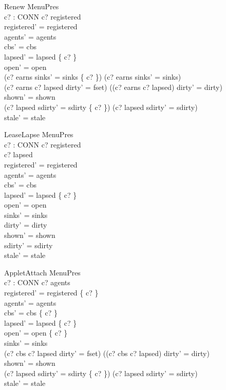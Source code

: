 \documentclass[a4paper,10pt,fleqn]{article}
\begin{document}
\begin{schema}{Renew}
  \Delta MenuPres \\
  c? : CONN
\where
  c? \in registered \\
  registered' = registered \\
  agents' = agents \\
  cbs' = cbs \\
  lapsed' = lapsed \setminus \{ c? \} \\
  open' = open \\
  (c? \in earns \land sinks' = sinks \oplus \{ c?  \}) \lor
    (c? \notin earns \land sinks' = sinks) \\
  (c? \in earns \land c? \in lapsed \land dirty' = fset) \lor
    (\lnot (c? \in earns \land c? \in lapsed) \land dirty' = dirty) \\
  shown' = shown \\
  (c? \in lapsed \land sdirty' = sdirty \cup \{ c? \}) \lor
    (c? \notin lapsed \land sdirty' = sdirty) \\
  stale' = stale
\end{schema}

\begin{schema}{LeaseLapse}
  \Delta MenuPres \\
  c? : CONN
\where
  c? \in registered \\
  c? \notin lapsed \\
  registered' = registered \\
  agents' = agents \\
  cbs' = cbs \\
  lapsed' = lapsed \cup \{ c? \} \\
  open' = open \\
  sinks' = sinks \\
  dirty' = dirty \\
  shown' = shown \\
  sdirty' = sdirty \\
  stale' = stale
\end{schema}

\begin{schema}{AppletAttach}
  \Delta MenuPres \\
  c? : CONN
\where
  c? \notin agents \\
  registered' = registered \cup \{ c? \} \\
  agents' = agents \\
  cbs' = cbs \setminus \{ c? \} \\
  lapsed' = lapsed \setminus \{ c? \} \\
  open' = open \cup \{ c? \} \\
  sinks' = sinks \\
  (c? \in cbs \land c? \notin lapsed \land dirty' = fset) \lor
    (\lnot (c? \in cbs \land c? \notin lapsed) \land dirty' = dirty) \\
  shown' = shown \\
  (c? \in lapsed \land sdirty' = sdirty \cup \{ c? \}) \lor
    (c? \notin lapsed \land sdirty' = sdirty) \\
  stale' = stale
\end{schema}
\end{document}
